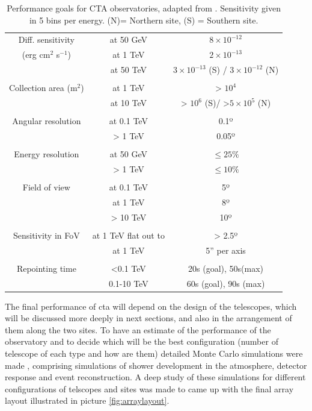 \documentclass[main.tex]{subfiles}
\begin{document}
\begin{table}
  \centering
  \begin{tabular}{ccc}
    \hline
    Diff. sensitivity & at 50 GeV & $8\times10^{-12}$\\
    (erg cm$^2$ s$^{-1}$) & at 1 TeV & $2\times10^{-13}$\\
     & at 50 TeV & $3\times10^{-13}$ (S) / $3\times10^{-12}$ (N)\\\\
    Collection area (m$^{2}$) & at 1 TeV & > $10^4$ \\
    & at 10 TeV & > $10^6$ (S)/ >$5\times10^5$ (N) \\\\
    Angular resolution & at 0.1 TeV & 0.1º \\
    & > 1 TeV & 0.05º \\\\
    Energy resolution & at 50 GeV & $\le 25\%$ \\
    & > 1 TeV & $\le 10\%$ \\\\
    Field of view & at 0.1 TeV & 5º\\
    & at 1 TeV & 8º\\
    & > 10 TeV & 10º\\\\
    Sensitivity in FoV & at 1 TeV flat out to & > 2.5º \\
    & at 1 TeV & 5'' per axis \\\\
    Repointing time & <0.1 TeV  & 20s (goal), 50s(max) \\
    & 0.1-10 TeV & 60s (goal), 90s (max) \\
    \hline
  \end{tabular}
  \caption{Performance goals for CTA observatories, adapted from \cite{CTAconcept}. Sensitivity given in 5 bins per energy. (N)= Northern site, (S) = Southern site.}
  \label{tab:CTAgoals}
\end{table}

The final performance of \gls{cta} will depend on the design of the telescopes, which will be discussed more deeply in next sections, and also in the arrangement of them along the two sites.
To have an estimate of the performance of the observatory and to decide which will be the best configuration (number of telescope of each type and how are them) detailed Monte Carlo simulations were made \cite{2013CTAMonteCarlo}, comprising simulations of shower development in the atmosphere, detector response and event reconstruction.
A deep study of these simulations \cite{2017CTAMCPerformance} for different configurations of telscopes and sites was made to came up with the final array layout illustrated in picture \ref{fig:arraylayout}.
\end{document}
